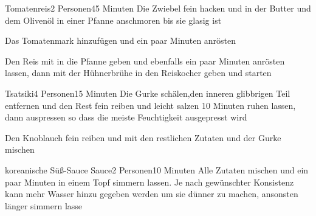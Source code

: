 
\begin{recipe}{Tomatenreis}{2 Personen}{45 Minuten}
Die Zwiebel fein hacken und in der Butter und dem Olivenöl in einer Pfanne anschmoren bis sie glasig ist

Das Tomatenmark hinzufügen und ein paar Minuten anrösten

Den Reis mit in die Pfanne geben und ebenfalls ein paar Minuten anrösten lassen, dann mit der Hühnerbrühe in den Reiskocher geben und starten
\end{recipe}


\begin{recipe}{Tsatsiki}{4 Personen}{15 Minuten}
Die Gurke schälen,den inneren glibbrigen Teil entfernen und den Rest fein reiben und leicht salzen
10 Minuten ruhen lassen, dann auspressen so dass die meiste Feuchtigkeit ausgepresst wird

Den Knoblauch fein reiben und mit den restlichen Zutaten und der Gurke mischen
\end{recipe}


\begin{recipe}{koreanische Süß-Sauce Sauce}{2 Personen}{10 Minuten}
Alle Zutaten mischen und ein paar Minuten in einem Topf simmern lassen. Je nach gewünschter Konsistenz kann mehr Wasser hinzu gegeben werden um sie dünner zu machen, ansonsten länger simmern lasse 
\end{recipe}


